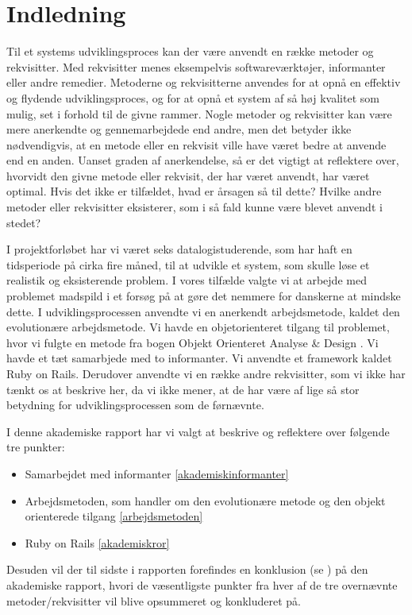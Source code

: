 \chapter{Indledning}

Til et systems udviklingsproces kan der være anvendt en række metoder og rekvisitter. Med rekvisitter menes eksempelvis softwareværktøjer, informanter eller andre remedier. Metoderne og rekvisitterne anvendes for at opnå en effektiv og flydende udviklingsproces, og for at opnå et system af så høj kvalitet som mulig, set i forhold til de givne rammer. Nogle metoder og rekvisitter kan være mere anerkendte og gennemarbejdede end andre, men det betyder ikke nødvendigvis, at en metode eller en rekvisit ville have været bedre at anvende end en anden. Uanset graden af anerkendelse, så er det vigtigt at reflektere over, hvorvidt den givne metode eller rekvisit, der har været anvendt, har været optimal. Hvis det ikke er tilfældet, hvad er årsagen så til dette? Hvilke andre metoder eller rekvisitter eksisterer, som i så fald kunne være blevet anvendt i stedet?

I projektforløbet har vi været seks datalogistuderende, som har haft en tidsperiode på cirka fire måned, til at udvikle et system, som skulle løse et realistik og eksisterende problem. I vores tilfælde valgte vi at arbejde med problemet madspild i et forsøg på at gøre det nemmere for danskerne at mindske dette. I udviklingsprocessen anvendte vi en anerkendt arbejdsmetode, kaldet den evolutionære arbejdsmetode. Vi havde en objetorienteret tilgang til problemet, hvor vi fulgte en metode fra bogen Objekt Orienteret Analyse \& Design \cite{ooad}. Vi havde et tæt samarbjede med to informanter. Vi anvendte et framework kaldet Ruby on Rails. Derudover anvendte vi en række andre rekvisitter, som vi ikke har tænkt os at beskrive her, da vi ikke mener, at de har være af lige så stor betydning for udviklingsprocessen som de førnævnte.

I denne akademiske rapport har vi valgt at beskrive og reflektere over følgende tre punkter:

\begin{itemize}[noitemsep]
  \item Samarbejdet med informanter \ref{akademiskinformanter}
  \item Arbejdsmetoden, som handler om den evolutionære metode og den objekt orienterede tilgang \ref{arbejdsmetoden}
  \item Ruby on Rails \ref{akademiskror}
\end{itemize}

Desuden vil der til sidste i rapporten forefindes en konklusion (se ) på den akademiske rapport, hvori de væsentligste punkter fra hver af de tre overnævnte metoder/rekvisitter vil blive opsummeret og konkluderet på.


